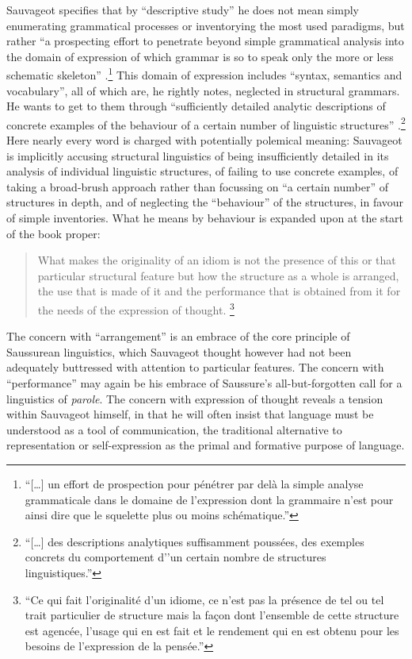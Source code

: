 \documentclass[output=paper]{langscibook}
\begin{document}
Sauvageot specifies that by ``descriptive study'' he does not mean simply enumerating grammatical processes or inventorying the most used paradigms, but rather ``a prospecting effort to penetrate beyond simple grammatical analysis into the domain of expression of which grammar is so to speak only the more or less schematic skeleton'' \citep[7]{Sauvageot1946}.\footnote{``[…] un effort de prospection pour pénétrer par delà la simple analyse grammaticale dans le domaine de l'expression dont la grammaire n'est pour ainsi dire que le squelette plus ou moins schématique.''} This domain of expression includes ``syntax, semantics and vocabulary'', all of which are, he rightly notes, neglected in structural grammars. He wants to get to them through ``sufficiently detailed analytic descriptions of concrete examples of the behaviour of a certain number of linguistic structures'' \citep[7]{Sauvageot1946}.\footnote{``[…] des descriptions analytiques suffisamment poussées, des exemples concrets du comportement d’'un certain nombre de structures linguistiques.''} Here nearly every word is charged with potentially polemical meaning: Sauvageot is implicitly accusing structural linguistics of being insufficiently detailed in its analysis of individual linguistic structures, of failing to use concrete examples, of taking a broad-brush approach rather than focussing on ``a certain number'' of structures in depth, and of neglecting the ``behaviour'' of the structures, in favour of simple inventories. What he means by behaviour is expanded upon at the start of the book proper: 

\begin{quotation}
What makes the originality of an idiom is not the presence of this or that particular structural feature but how the structure as a whole is arranged, the use that is made of it and the performance that is obtained from it for the needs of the expression of thought. \citep[13]{Sauvageot1946}\footnote{``Ce qui fait l'originalité d'un idiome, ce n'est pas la présence de tel ou tel trait particulier de structure mais la façon dont l'ensemble de cette structure est agencée, l'usage qui en est fait et le rendement qui en est obtenu pour les besoins de l'expression de la pensée.''} 
\end{quotation}

The concern with ``arrangement'' is an embrace of the core principle of Saussurean linguistics, which Sauvageot thought however had not been adequately buttressed with attention to particular features. The concern with ``performance'' may again be his embrace of Saussure's all-but-forgotten call for a linguistics of \emph{parole}. The concern with expression of thought reveals a tension within Sauvageot himself, in that he will often insist that language must be understood as a tool of communication, the traditional alternative to representation or self-expression as the primal and formative purpose of language.
\end{document}
